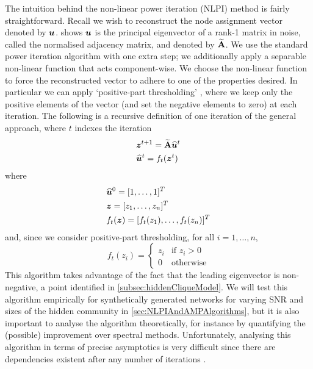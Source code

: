 The intuition behind the non-linear power iteration (NLPI) method is fairly straightforward.
Recall we wish to reconstruct the node assignment vector denoted by $\vecvar{u}$.  shows $\vecvar{u}$ is the principal eigenvector of a rank-1 matrix in noise, called the normalised adjacency matrix, and denoted by $\widetilde{\mathbf A}$.
We use the standard power iteration algorithm with one extra step; we additionally apply a separable non-linear function that acts component-wise.
We choose the non-linear function to force the reconstructed vector to adhere to one of the properties desired. In particular we can apply `positive-part thresholding' \cite{Mon13}, where we keep only the positive elements of the vector (and set the negative elements to zero) at each iteration.
The following is a recursive definition of one iteration of the general approach, where $t$ indexes the iteration
\begin{equation}
	\label{eq:NLPIAlgorithm}
	\begin{split}
		&\vecvar{z}^{t+1} = \widetilde{\matvar{A}} \widehat{\vecvar{u}}^{t} \\
		&\widehat{\vecvar{u}}^{t} = f_{t}(\vecvar{z}^{t})
	\end{split}
\end{equation}
where
\begin{equation}
	\label{eq:NLPIAlgorithmConditions}
	\begin{split}
		&\widehat{\vecvar{u}}^{0} = \transpose{[1,\dots,1]} \\
		&\vecvar{z} = \transpose{[z_{1},\dots,z_{n}]} \\
		&f_{t}(\vecvar{z}) = \transpose{[f_{t}(z_{1}),\dots,f_{t}(z_{n})]}
	\end{split}
\end{equation}
and, since we consider positive-part thresholding, for all $i=1,\dots,n$,
\begin{equation}
	\label{eq:NLPIAlgorithmThresholding}
	f_{t}(z_{i}) =
	\begin{cases}
		z_{i}& \text{if } z_{i} > 0\\
		0 & \text{otherwise}
	\end{cases}
\end{equation}
This algorithm takes advantage of the fact that the leading eigenvector is non-negative, a point identified in \cref{subsec:hiddenCliqueModel}.
We will test this algorithm empirically for synthetically generated networks for varying SNR and sizes of the hidden community in \cref{sec:NLPIAndAMPAlgorithms}, but it is also important to analyse the algorithm theoretically, for instance by quantifying the (possible) improvement over spectral methods.
Unfortunately, analysing this algorithm in terms of precise asymptotics is very difficult since there are dependencies existent after any number of iterations \cite{Mon13}.

